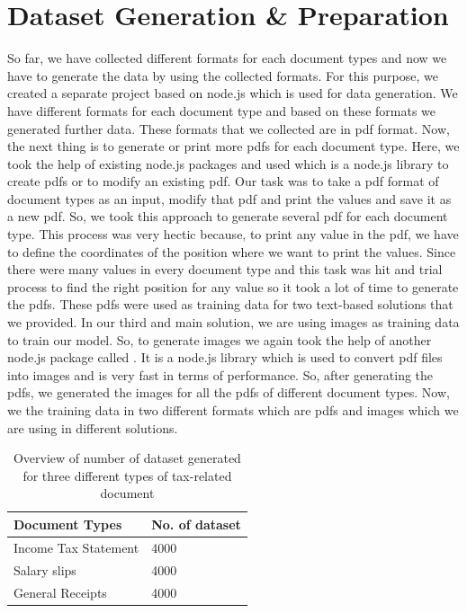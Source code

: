 \section{Dataset Generation \& Preparation}
So far, we have collected different formats for each document types and now we have to generate the data by using the collected formats. For this purpose, we created a separate project based on node.js which is used for data generation. We have different formats for each document type and based on these formats we generated further data. These formats that we collected are in pdf format. Now, the next thing is to generate or print more pdfs for each document type. Here, we took the help of existing node.js packages and used  \cite{hummus_recipe} which is a node.js library to create pdfs or to modify an existing pdf. Our task was to take a pdf format of document types as an input, modify that pdf and print the values and save it as a new pdf. So, we took this approach to generate several pdf for each document type. This process was very hectic because, to print any value in the pdf, we have to define the coordinates of the position where we want to print the values. Since there were many values in every document type and this task was hit and trial process to find the right position for any value so it took a lot of time to generate the pdfs. These pdfs were used as training data for two text-based solutions that we provided. In our third and main solution, we are using images as training data to train our model. So, to generate images we again took the help of another node.js package called  \cite{pdf_poppler}. It is a node.js library which is used to convert pdf files into images and is very fast in terms of performance. So, after generating the pdfs, we generated the images for all the pdfs of different document types. Now, we the training data in two different formats which are pdfs and images which we are using in different solutions.
\begin{table}[H]
\centering
\begin{tabular}{l | l }
Document Types & No. of dataset\\
\hline
Income Tax Statement & 4000 \\
Salary slips & 4000 \\
General Receipts & 4000
\end{tabular}
\caption{Overview of number of dataset generated for three different types of tax-related document}
\label{dataset_count}
\end{table}
